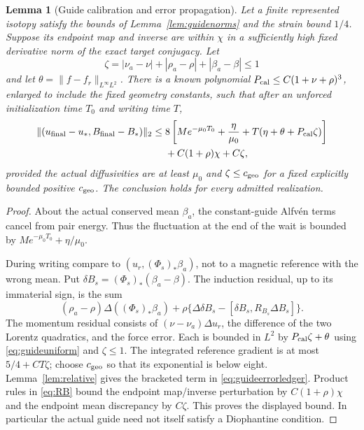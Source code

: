 \documentclass[11pt,a4paper]{amsart}
\newtheorem{lemma}[theorem]{Lemma}
\theoremstyle{definition}
\theoremstyle{remark}
\numberwithin{equation}{section}
\newcommand{\norm}[1]{\lVert #1\rVert}
\newcommand{\push}[1]{(#1)_*}
\begin{document}
\begin{lemma}[Guide calibration and error propagation]\label{lem:guidebudget}
Let a finite represented isotopy satisfy the bounds of Lemma~\ref{lem:guidenorms} and the strain bound $1/4$. Suppose its endpoint map and inverse are within $\chi$ in a sufficiently high fixed derivative norm of the exact target conjugacy. Let
\[
 \zeta=|\nu_a-\nu|+|\rho_a-\rho|+|\beta_a-\beta|\le1
\]
and let $\theta=\norm{f-f_r}_{L^\infty L^2}$. There is a known polynomial $P_{\rm cal}\le C(1+\nu+\rho)^3$, enlarged to include the fixed geometry constants, such that after an unforced initialization time $T_0$ and writing time $T$,
\begin{align}
 \norm{(u_{\rm final}-u_*,B_{\rm final}-B_*)}_2
 \le{}&8\left[Me^{-\mu_0T_0}+\frac{\eta}{\mu_0}
                 +T(\eta+\theta+P_{\rm cal}\zeta)\right]\notag\\
 &+C(1+\rho)\chi+C\zeta,\label{eq:guideerrorledger}
\end{align}
provided the actual diffusivities are at least $\mu_0$ and
$\zeta\le c_{\rm geo}$ for a fixed explicitly bounded positive $c_{\rm geo}$.
The conclusion holds for every admitted realization.
\end{lemma}

\begin{proof}
About the actual conserved mean $\beta_a$, the constant-guide Alfv\'en terms cancel from pair energy. Thus the fluctuation at the end of the wait is bounded by $Me^{-\mu_0T_0}+\eta/\mu_0$.

During writing compare to $(u_r,\push{\Phi_s}\beta_a)$, not to a magnetic reference with the wrong mean. Put $\delta B_s=\push{\Phi_s}(\beta_a-\beta)$. The induction residual, up to its immaterial sign, is the sum
\[
 (\rho_a-\rho)\Delta(\push{\Phi_s}\beta_a)
 +\rho\{\Delta\delta B_s-[\delta B_s,R_{B_s}\Delta B_s]\}.
\]
The momentum residual consists of $(\nu-\nu_a)\Delta u_r$, the difference of the two Lorentz quadratics, and the force error. Each is bounded in $L^2$ by $P_{\rm cal}\zeta+\theta$ using \eqref{eq:guideuniform} and $\zeta\le1$. The integrated reference gradient is at most $5/4+CT\zeta$; choose $c_{\rm geo}$ so that its exponential is below eight. Lemma~\ref{lem:relative} gives the bracketed term in \eqref{eq:guideerrorledger}. Product rules in \eqref{eq:RB} bound the endpoint map/inverse perturbation by $C(1+\rho)\chi$ and the endpoint mean discrepancy by $C\zeta$. This proves the displayed bound. In particular the actual guide need not itself satisfy a Diophantine condition.
\end{proof}
\end{document}
